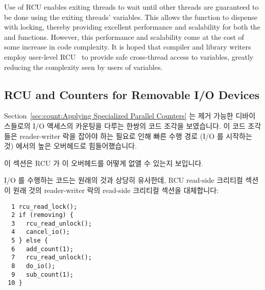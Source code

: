 Use of RCU enables exiting threads to wait until other threads are
guaranteed to be done using the exiting threads'  variables.
This allows the  function to dispense with locking,
thereby providing
excellent performance and scalability for both the 
and  functions.
However, this performance and scalability come at the cost of some increase
in code complexity.
It is hoped that compiler and library writers employ user-level
RCU~\cite{MathieuDesnoyers2009URCU} to provide safe cross-thread
access to  variables, greatly reducing the
complexity seen by users of  variables.
\fi

\subsection{RCU and Counters for Removable I/O Devices}
\label{sec:together:RCU and Counters for Removable I/O Devices}

Section~\ref{sec:count:Applying Specialized Parallel Counters}
는 제거 가능한 디바이스들로의 I/O 액세스의 카운팅을 다루는 한쌍의 코드 조각을
보였습니다.
이 코드 조각들은 reader-writer 락을 잡아야 하는 필요로 인해 빠른 수행 경로 (I/O
를 시작하는 것) 에서의 높은 오버헤드로 힘들어했습니다.

이 섹션은 RCU 가 이 오버헤드를 어떻게 없앨 수 있는지 보입니다.

I/O 를 수행하는 코드는 원래의 것과 상당히 유사한데, RCU read-side 크리티컬
섹션이 원래 것의 reader-writer 락의 read-side 크리티컬 섹션을 대체합니다:
\iffalse

Section~\ref{sec:count:Applying Specialized Parallel Counters}
showed a fanciful pair of code fragments for dealing with counting
I/O accesses to removable devices.
These code fragments suffered from high overhead on the fastpath
(starting an I/O) due to the need to acquire a reader-writer
lock.

This section shows how RCU may be used to avoid this overhead.

The code for performing an I/O is quite similar to the original, with
a RCU read-side critical section being substituted for the reader-writer
lock read-side critical section in the original:
\fi

\vspace{5pt}
\begin{minipage}[t]{\columnwidth}
\small
\begin{verbatim}
  1 rcu_read_lock();
  2 if (removing) {
  3   rcu_read_unlock();
  4   cancel_io();
  5 } else {
  6   add_count(1);
  7   rcu_read_unlock();
  8   do_io();
  9   sub_count(1);
 10 }
\end{verbatim}
\end{minipage}
\vspace{5pt}

